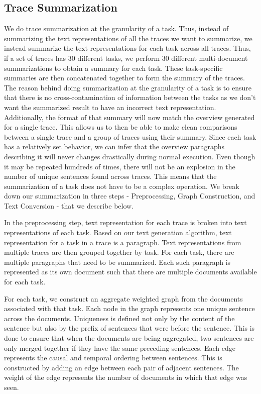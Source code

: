 \subsection{Trace Summarization}

We do trace summarization at the granularity of a task. Thus, instead of summarizing the text representations of all the traces we want to summarize,
we instead summarize the text representations for each task across all traces. Thus, if a set of traces has 30 different tasks,
we perform 30 different multi-document summarizations to obtain a summary for each task. These task-specific summaries
are then concatenated together to form the summary of the traces.
The reason behind doing summarization at the granularity of a task is to ensure that there is no cross-contamination
of information between the tasks as we don't want the summarized result to have an incorrect text representation.
Additionally, the format of that summary will now match the overview generated for a
single trace. This allows us to then be able to make clean comparisons between a single trace and a group of traces using their summary.
Since each task has a relatively set behavior,
we can infer that the overview paragraphs describing it will never changes drastically during normal execution. Even though it may be repeated hundreds of times, 
there will not be an explosion in the number of unique sentences found across traces. This means that the 
summarization of a task does not have to be a complex operation.
We break down our summarization in three steps - Preprocessing, Graph Construction, and Text Conversion - that we describe below.

 In the preprocessing step, text representation for each trace is broken into text representations of each
task. Based on our text generation algorithm, text representation for a task in a trace is a paragraph.
Text representations from multiple traces are then grouped together by task. For each task, there are multiple
paragraphs that need to be summarized. Each such paragraph is represented as its own document such that
there are multiple documents available for each task.

 For each task, we construct an aggregate weighted graph from the documents associated with that task.
Each node in the graph represents one unique sentence across the documents. Uniqueness is defined not only by the content
of the sentence but also by the prefix of sentences that were before the sentence. This is done to ensure that
when the documents are being aggregated, two sentences are only merged together if they have the same preceding
sentences. Each edge represents the causal and temporal ordering between sentences. This is constructed by adding
an edge between each pair of adjacent sentences. The weight of the edge represents the number of documents in
which that edge was seen.

